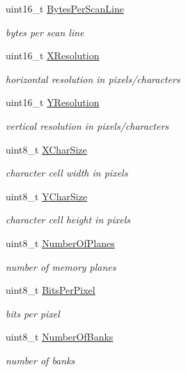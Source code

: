 \begin{DoxyCompactItemize}
uint16\+\_\+t \hyperlink{struct____attribute_____a3c9eb4b107ecee102c6e63f9054ede06}{Bytes\+Per\+Scan\+Line}
\begin{DoxyCompactList}\small\item\em bytes per scan line \end{DoxyCompactList}\item 
uint16\+\_\+t \hyperlink{struct____attribute_____abe48e2b29aa99e813a1447d22711f4f4}{X\+Resolution}
\begin{DoxyCompactList}\small\item\em horizontal resolution in pixels/characters \end{DoxyCompactList}\item 
uint16\+\_\+t \hyperlink{struct____attribute_____aa91385451d974d9c33978062e22d39e2}{Y\+Resolution}
\begin{DoxyCompactList}\small\item\em vertical resolution in pixels/characters \end{DoxyCompactList}\item 
uint8\+\_\+t \hyperlink{struct____attribute_____acac41a300563737d7849a92cd1d5c10b}{X\+Char\+Size}
\begin{DoxyCompactList}\small\item\em character cell width in pixels \end{DoxyCompactList}\item 
uint8\+\_\+t \hyperlink{struct____attribute_____acb93d86860efea5c87e3c2950f39123e}{Y\+Char\+Size}
\begin{DoxyCompactList}\small\item\em character cell height in pixels \end{DoxyCompactList}\item 
uint8\+\_\+t \hyperlink{struct____attribute_____ab1471d2f75e61117d65290da9070cf89}{Number\+Of\+Planes}
\begin{DoxyCompactList}\small\item\em number of memory planes \end{DoxyCompactList}\item 
uint8\+\_\+t \hyperlink{struct____attribute_____abd9c59af53589a54188bb57ada5c5f26}{Bits\+Per\+Pixel}
\begin{DoxyCompactList}\small\item\em bits per pixel \end{DoxyCompactList}\item 
uint8\+\_\+t \hyperlink{struct____attribute_____a59483378dd87414afcde6cb3ca93c2d8}{Number\+Of\+Banks}
\begin{DoxyCompactList}\small\item\em number of banks \end{DoxyCompactList}\item 

\end{DoxyCompactItemize}
